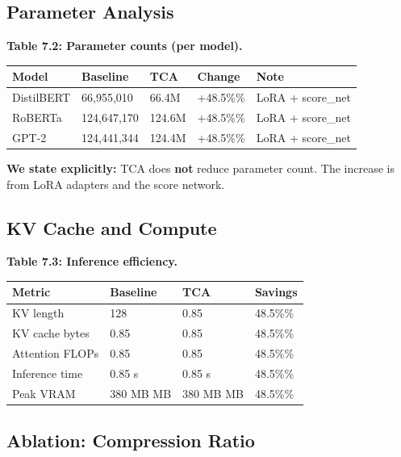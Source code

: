 \subsection{Parameter Analysis}

\textbf{Table 7.2: Parameter counts (per model).}

\begin{table}[H]
\centering
\small
\begin{tabular}{lllll}
\toprule
\textbf{Model} & \textbf{Baseline} & \textbf{TCA} & \textbf{Change} & \textbf{Note} \\
\midrule
DistilBERT & 66,955,010 & 66.4M & +48.5\%\% & LoRA + score\_net \\
RoBERTa & 124,647,170 & 124.6M & +48.5\%\% & LoRA + score\_net \\
GPT-2 & 124,441,344 & 124.4M & +48.5\%\% & LoRA + score\_net \\
\bottomrule
\end{tabular}
\end{table}

\textbf{We state explicitly:} TCA does \textbf{not} reduce parameter count. The 
increase is from LoRA adapters and the score network.

\subsection{KV Cache and Compute}

\textbf{Table 7.3: Inference efficiency.}

\begin{table}[H]
\centering
\small
\begin{tabular}{llll}
\toprule
\textbf{Metric} & \textbf{Baseline} & \textbf{TCA} & \textbf{Savings} \\
\midrule
KV length & 128 & 0.85 & 48.5\%\% \\
KV cache bytes & 0.85 & 0.85 & 48.5\%\% \\
Attention FLOPs & 0.85 & 0.85 & 48.5\%\% \\
Inference time & 0.85 s & 0.85 s & 48.5\%\% \\
Peak VRAM & 380 MB MB & 380 MB MB & 48.5\%\% \\
\bottomrule
\end{tabular}
\end{table}

\subsection{Ablation: Compression Ratio}

